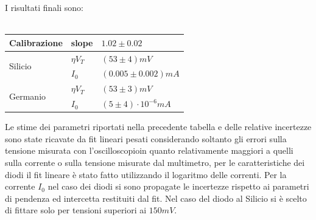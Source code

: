 \documentclass{amsart}
\begin{document}
    I risultati finali sono:\\
    \hfill \\
    \begin{center}
        \begin{tabular}{|p{2cm}|p{1cm}|p{3cm}|}
            \hline
            Calibrazione & slope & $1.02 \pm 0.02$ \\
            \hline
            \multirow{2}{*}{Silicio}      & $\eta V_T$ & $(53 \pm 4)mV$ \\
                                        & $I_0$ & $(0.005 \pm 0.002) mA $ \\
            \hline
            \multirow{2}{*}{Germanio}      & $\eta V_T$ & $(53 \pm 3)mV$ \\
                                        & $I_0$ & $ (5 \pm 4) \cdot 10^{-6} mA$\\
            \hline  
        \end{tabular}
    \end{center}
    \vspace{0.5cm}
    Le stime dei parametri riportati nella precedente tabella e delle relative incertezze sono state ricavate da fit lineari pesati
    considerando soltanto gli errori sulla tensione misurata con l'oscilloscopioin quanto relativamente maggiori 
    a quelli sulla corrente o sulla tensione misurate dal multimetro, per le caratteristiche dei diodi il fit lineare è stato 
    fatto utilizzando il logaritmo delle correnti. Per la corrente $I_0$ nel caso dei diodi si sono propagate le incertezze rispetto
    ai parametri di pendenza ed intercetta restituiti dal fit. Nel caso del diodo al Silicio si è scelto di fittare solo per tensioni
    superiori ai $150mV$.
\end{document}
